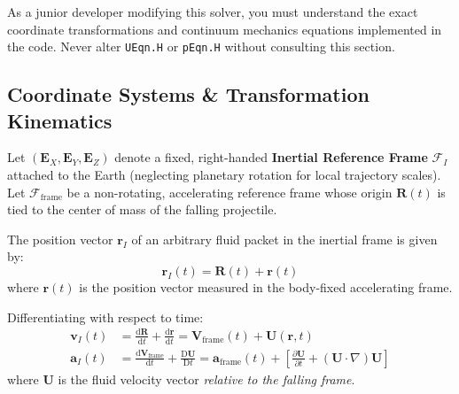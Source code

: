 \documentclass[11pt,a4paper]{article}
\newcommand{\vect}[1]{\mathbf{#1}}
\newcommand{\grad}{\nabla}
\newcommand{\pderiv}[2]{\frac{\partial #1}{\partial #2}}
\newcommand{\dderiv}[2]{\frac{\mathrm{d} #1}{\mathrm{d} #2}}
\newcommand{\Dderiv}[2]{\frac{\mathrm{D} #1}{\mathrm{D} #2}}
\newcommand{\aframe}{\vect{a}_{\mathrm{frame}}}
\newcommand{\vframe}{\vect{V}_{\mathrm{frame}}}
\begin{document}
As a junior developer modifying this solver, you must understand the exact coordinate transformations and continuum mechanics equations implemented in the code. Never alter \texttt{UEqn.H} or \texttt{pEqn.H} without consulting this section.

\subsection{Coordinate Systems \& Transformation Kinematics}
Let $(\vect{E}_X, \vect{E}_Y, \vect{E}_Z)$ denote a fixed, right-handed \textbf{Inertial Reference Frame} $\mathcal{F}_I$ attached to the Earth (neglecting planetary rotation for local trajectory scales). 
Let $\mathcal{F}_{\mathrm{frame}}$ be a non-rotating, accelerating reference frame whose origin $\vect{R}(t)$ is tied to the center of mass of the falling projectile.

The position vector $\vect{r}_I$ of an arbitrary fluid packet in the inertial frame is given by:
\begin{equation}
    \vect{r}_I(t) = \vect{R}(t) + \vect{r}(t)
\end{equation}
where $\vect{r}(t)$ is the position vector measured in the body-fixed accelerating frame.

Differentiating with respect to time:
\begin{align}
    \vect{v}_I(t) &= \dderiv{\vect{R}}{t} + \dderiv{\vect{r}}{t} = \vframe(t) + \vect{U}(\vect{r}, t) \\
    \vect{a}_I(t) &= \dderiv{\vframe}{t} + \Dderiv{\vect{U}}{t} = \aframe(t) + \left[ \pderiv{\vect{U}}{t} + (\vect{U} \cdot \grad)\vect{U} \right]
\end{align}
where $\vect{U}$ is the fluid velocity vector \emph{relative to the falling frame}.
\end{document}
